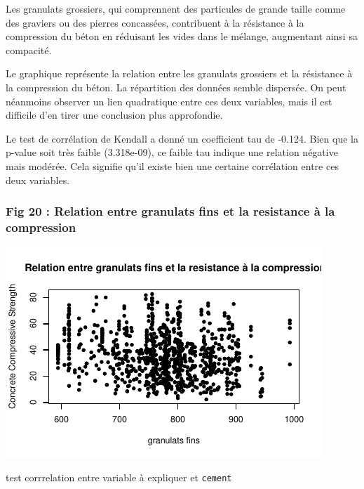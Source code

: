 \documentclass[
  12pt,
]{article}
\newenvironment{Shaded}{\begin{snugshade}}{\end{snugshade}}
\newcommand{\AttributeTok}[1]{\textcolor[rgb]{0.13,0.29,0.53}{#1}}
\newcommand{\FunctionTok}[1]{\textcolor[rgb]{0.13,0.29,0.53}{\textbf{#1}}}
\newcommand{\NormalTok}[1]{#1}
\newcommand{\SpecialCharTok}[1]{\textcolor[rgb]{0.81,0.36,0.00}{\textbf{#1}}}
\newcommand{\StringTok}[1]{\textcolor[rgb]{0.31,0.60,0.02}{#1}}
\begin{document}
Les granulats grossiers, qui comprennent des particules de grande taille
comme des graviers ou des pierres concassées, contribuent à la
résistance à la compression du béton en réduisant les vides dans le
mélange, augmentant ainsi sa compacité.

Le graphique représente la relation entre les granulats grossiers et la
résistance à la compression du béton. La répartition des données semble
dispersée. On peut néanmoins observer un lien quadratique entre ces deux
variables, mais il est difficile d'en tirer une conclusion plus
approfondie.

Le test de corrélation de Kendall a donné un coefficient tau de -0.124.
Bien que la p-value soit très faible (3.318e-09), ce faible tau indique
une relation négative mais modérée. Cela signifie qu'il existe bien une
certaine corrélation entre ces deux variables.

\subsubsection{Fig 20 : Relation entre granulats fins et la resistance à
la
compression}\label{fig-20-relation-entre-granulats-fins-et-la-resistance-uxe0-la-compression}

\begin{center}\includegraphics{rmd_final_files/figure-latex/unnamed-chunk-24-1} \end{center}

test corrrelation entre variable à expliquer et \texttt{cement}

\begin{Shaded}
\end{Shaded}
\end{document}

